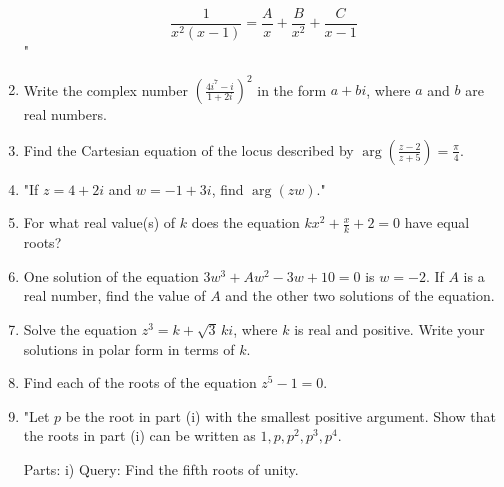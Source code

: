 \documentclass{article}
\begin{document}
\begin{enumerate}
\[
\frac{1}{x^2(x-1)} = \frac{A}{x} + \frac{B}{x^2} + \frac{C}{x-1}
\]"
\vspace{3cm}
\item Write the complex number \(\left( \frac{4i^7 - i}{1 + 2i} \right)^2\) in the form \( a + bi \), where \( a \) and \( b \) are real numbers.
\vspace{3cm}
\item Find the Cartesian equation of the locus described by \(\arg \left( \frac{z - 2}{z + 5} \right) = \frac{\pi}{4}\).
\vspace{3cm}
\item "If \( z = 4 + 2i \) and \( w = -1 + 3i \), find \(\arg(zw)\)."
\vspace{3cm}
\item For what real value(s) of \( k \) does the equation \( kx^2 + \frac{x}{k} + 2 = 0 \) have equal roots?
\vspace{3cm}
\item One solution of the equation \( 3w^3 + Aw^2 - 3w + 10 = 0 \) is \( w = -2 \). If \( A \) is a real number, find the value of \( A \) and the other two solutions of the equation.
\vspace{3cm}
\item Solve the equation \( z^3 = k + \sqrt{3} \, ki \), where \( k \) is real and positive. Write your solutions in polar form in terms of \( k \).
\vspace{3cm}
\item Find each of the roots of the equation \( z^5 - 1 = 0 \).
\vspace{3cm}
\item "Let \( p \) be the root in part (i) with the smallest positive argument. Show that the roots in part (i) can be written as \( 1, p, p^2, p^3, p^4 \).

Parts:
i) Query: Find the fifth roots of unity.


\end{enumerate}
\end{document}
